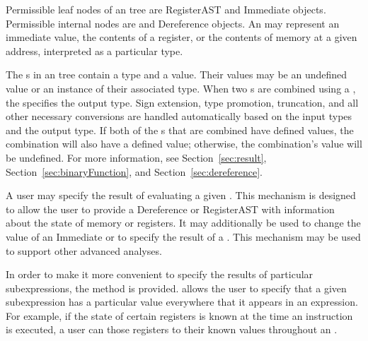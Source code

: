 \begin{apient}

Permissible leaf nodes of an  tree are RegisterAST and Immediate
objects. Permissible internal nodes are  and Dereference objects.
An  may represent an immediate value, the contents of a register, or
the contents of memory at a given address, interpreted as a particular type.

The s in an  tree contain a type and a value. Their values may
be an undefined value or an instance of their associated type. When two s
are combined using a , the  specifies the output
type. Sign extension, type promotion, truncation, and all other necessary
conversions are handled automatically based on the input types and the output
type. If both of the s that are combined have defined values, the
combination will also have a defined value; otherwise, the combination's value
will be undefined. For more information, see
Section~\ref{sec:result}, Section~\ref{sec:binaryFunction}, and
Section~\ref{sec:dereference}.

A user may specify the result of evaluating a given . This mechanism
is designed to allow the user to provide a Dereference or RegisterAST with
information about the state of memory or registers. It may additionally be used
to change the value of an Immediate or to specify the result of a
. This mechanism may be used to support other advanced analyses.

In order to make it more convenient to specify the results of particular
subexpressions, the  method is provided.  allows the user
to specify that a given subexpression has a particular value everywhere that it
appears in an expression. For example, if the state of certain registers is
known at the time an instruction is executed, a user can  those
registers to their known values throughout an .


\end{apient}
